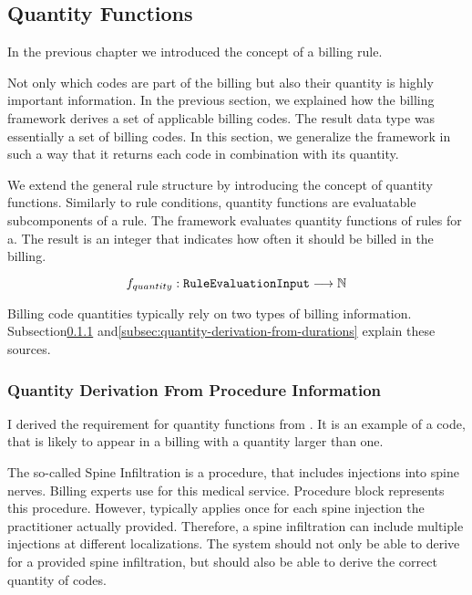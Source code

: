 \subsection{Quantity Functions}\label{subsec:numeric-functions}

In the previous chapter we introduced the concept of a billing rule.

Not only which codes are part of the billing but also their quantity is highly important information.
In the previous section, we explained how the billing framework derives a set of applicable billing codes.
The result data type was essentially a set of billing codes.
In this section, we generalize the framework in such a way that it returns each code in combination with its quantity.

We extend the general rule structure by introducing the concept of quantity functions.
Similarly to rule conditions, quantity functions are evaluatable subcomponents of a rule.
The framework evaluates quantity functions of rules for a.
The result is an integer that indicates how often it should be billed in the billing.

\begin{equation}
    \label{eq:quantity-function-natural}
    f_{quantity}: \texttt{RuleEvaluationInput} \longrightarrow \mathbb{N}
\end{equation}

Billing code quantities typically rely on two types of billing information.
Subsection\ref{subsubsec:quantity-derivation-from-procedure-information} and\ref{subsec:quantity-derivation-from-durations} explain these sources.

\subsubsection{Quantity Derivation From Procedure Information}\label{subsubsec:quantity-derivation-from-procedure-information}

I derived the requirement for quantity functions from .
It is an example of a code, that is likely to appear in a billing with a quantity larger than one.

The so-called Spine Infiltration is a procedure, that includes injections into spine nerves.
Billing experts use  for this medical service.
Procedure block  represents this procedure.
However,  typically applies once for each spine injection the practitioner actually provided.
Therefore, a spine infiltration can include multiple injections at different localizations.
The system should not only be able to derive  for a provided spine infiltration, but should also be able to derive the correct quantity of  codes.

